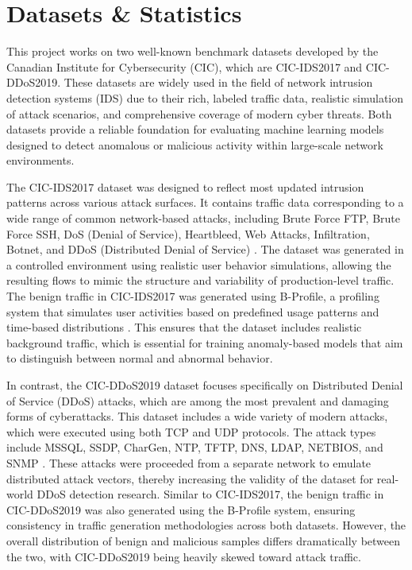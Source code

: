 \section{Datasets \& Statistics}

This project works on two well-known benchmark datasets developed by the Canadian Institute for Cybersecurity (CIC), which are CIC-IDS2017 and CIC-DDoS2019. These datasets are widely used in the field of network intrusion detection systems (IDS) due to their rich, labeled traffic data, realistic simulation of attack scenarios, and comprehensive coverage of modern cyber threats. Both datasets provide a reliable foundation for evaluating machine learning models designed to detect anomalous or malicious activity within large-scale network environments.

The CIC-IDS2017 dataset was designed to reflect most updated intrusion patterns across various attack surfaces. It contains traffic data corresponding to a wide range of common network-based attacks, including Brute Force FTP, Brute Force SSH, DoS (Denial of Service), Heartbleed, Web Attacks, Infiltration, Botnet, and DDoS (Distributed Denial of Service) \citep{cicids2017}. The dataset was generated in a controlled environment using realistic user behavior simulations, allowing the resulting flows to mimic the structure and variability of production-level traffic. The benign traffic in CIC-IDS2017 was generated using B-Profile, a profiling system that simulates user activities based on predefined usage patterns and time-based distributions \citep{Sharafaldin2018TowardGA}. This ensures that the dataset includes realistic background traffic, which is essential for training anomaly-based models that aim to distinguish between normal and abnormal behavior.

In contrast, the CIC-DDoS2019 dataset focuses specifically on Distributed Denial of Service (DDoS) attacks, which are among the most prevalent and damaging forms of cyberattacks. This dataset includes a wide variety of modern attacks, which were executed using both TCP and UDP protocols. The attack types include MSSQL, SSDP, CharGen, NTP, TFTP, DNS, LDAP, NETBIOS, and SNMP \citep{cicddos2019}. These attacks were proceeded from a separate network to emulate distributed attack vectors, thereby increasing the validity of the dataset for real-world DDoS detection research. Similar to CIC-IDS2017, the benign traffic in CIC-DDoS2019 was also generated using the B-Profile system, ensuring consistency in traffic generation methodologies across both datasets. However, the overall distribution of benign and malicious samples differs dramatically between the two, with CIC-DDoS2019 being heavily skewed toward attack traffic.


